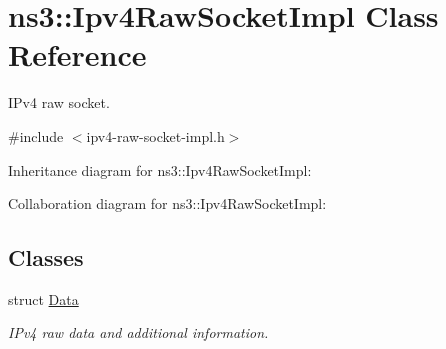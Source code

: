 \hypertarget{classns3_1_1Ipv4RawSocketImpl}{}\section{ns3\+:\+:Ipv4\+Raw\+Socket\+Impl Class Reference}
\label{classns3_1_1Ipv4RawSocketImpl}


I\+Pv4 raw socket.  




{\ttfamily \#include $<$ipv4-\/raw-\/socket-\/impl.\+h$>$}



Inheritance diagram for ns3\+:\+:Ipv4\+Raw\+Socket\+Impl\+:


Collaboration diagram for ns3\+:\+:Ipv4\+Raw\+Socket\+Impl\+:
\subsection*{Classes}
\begin{DoxyCompactItemize}
\item 
struct \hyperlink{structns3_1_1Ipv4RawSocketImpl_1_1Data}{Data}
\begin{DoxyCompactList}\small\item\em I\+Pv4 raw data and additional information. \end{DoxyCompactList}\end{DoxyCompactItemize}
